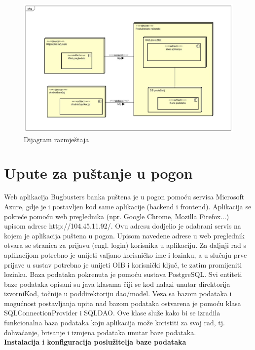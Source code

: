 			\begin{figure}[H]
				\includegraphics[scale=0.3]{Slike/dijagram_razmjestaja.jpg}
				\centering
				\caption{Dijagram razmještaja}
				\label{fig:dijagram}
			\end{figure}
		
		\newpage
		\section{Upute za puštanje u pogon}
		Web aplikacija Bugbusters banka puštena je u pogon pomoću servisa Microsoft Azure, gdje je i postavljen kod same aplikacije (backend i frontend). Aplikacija se pokreće pomoću web preglednika (npr. Google Chrome, Mozilla Firefox...) upisom adrese http://104.45.11.92/. Ovu adresu dodjelio je odabrani servis na kojem je aplikacija puštena u pogon. Upisom navedene adrese u web preglednik otvara se stranica za prijavu (engl. login) korisnika u aplikaciju. Za daljnji rad s aplikacijom potrebno je unijeti valjano korisničko ime i lozinku, a u slučaju prve prijave u sustav potrebno je unijeti OIB i korisnički ključ, te zatim promijeniti lozinku. Baza podataka pokrenuta je pomoću sustava PostgreSQL. Svi entiteti baze podataka opisani su java klasama čiji se kod nalazi unutar direktorija izvorniKod, točnije u poddirektoriju dao/model. Veza sa bazom podataka i mogućnost postavljanja upita nad bazom podataka ostvarena je pomoću klasa SQLConnectionProvider i SQLDAO. Ove klase služe kako bi se izradila funkcionalna baza podataka koju aplikacija može koristiti za svoj rad, tj. dohvaćanje, brisanje i izmjena podataka unutar baze podataka.\\
		
	 \textbf{Instalacija i konfiguracija poslužitelja baze podataka}
		
